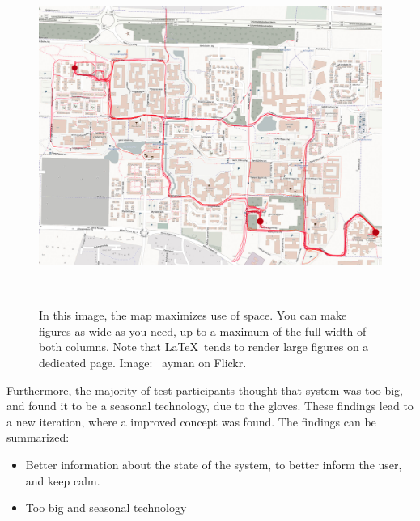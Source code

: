 \documentclass{sigchi}
\begin{document}
\begin{figure}
  \centering
  \includegraphics[width=1.20\columnwidth]{figures/heatmap.jpg}
  \caption{In this image, the map maximizes use of space. You can make
    figures as wide as you need, up to a maximum of the full width of
    both columns. Note that \LaTeX\ tends to render large figures on a
    dedicated page. Image: \ccbynd~ayman on
    Flickr.}~\label{fig:figure2}
\end{figure} 
Furthermore, the majority of test participants thought that system was too big, and found it to be a seasonal technology, due to the gloves.
These findings lead to a new iteration, where a improved concept was found. The findings can be summarized:
\begin{itemize}
\item Better information about the state of the system, to better inform the user, and keep calm.
\item Too big and seasonal technology 
\end{itemize}  
\end{document}
